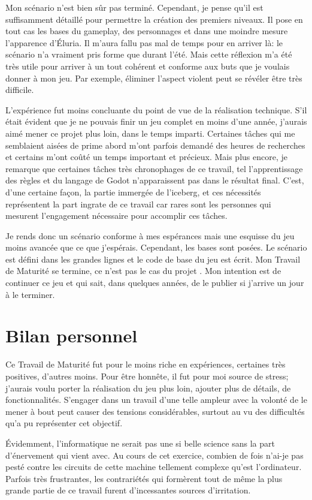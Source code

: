 Mon scénario n'est bien sûr pas terminé. Cependant, je pense qu'il est suffisamment détaillé pour permettre la création des premiers niveaux. Il pose en tout cas les bases du gameplay, des personnages et dans une moindre mesure l'apparence d'Éluria. Il m'aura fallu pas mal de temps pour en arriver là: le scénario n'a vraiment pris forme que durant l'été. Mais cette réflexion m'a été très utile pour arriver à un tout cohérent et conforme aux buts que je voulais donner à mon jeu. Par exemple, éliminer l'aspect violent peut se révéler être très difficile.

L'expérience fut moins concluante du point de vue de la réalisation technique. S'il était évident que je ne pouvais finir un jeu complet en moins d'une année, j'aurais aimé mener ce projet plus loin, dans le temps imparti. Certaines tâches qui me semblaient aisées de prime abord m'ont parfois demandé des heures de recherches et certains  m'ont coûté un temps important et précieux. Mais plus encore, je remarque que certaines tâches très chronophages de ce travail, tel l'apprentissage des règles et du langage de Godot n'apparaissent pas dans le résultat final. C'est, d'une certaine façon, la partie immergée de l'iceberg, et ces nécessités représentent la part ingrate de ce travail car rares sont les personnes qui mesurent l'engagement nécessaire pour accomplir ces tâches.

Je rends donc un scénario conforme à mes espérances mais une esquisse du jeu moins avancée que ce que j'espérais. Cependant, les bases sont posées. Le scénario est défini dans les grandes lignes et le code de base du jeu est écrit. Mon Travail de Maturité se termine, ce n'est pas le cas du projet \nomJeu. Mon intention est de continuer ce jeu et qui sait, dans quelques années, de le publier si j'arrive un jour à le terminer.


\section{Bilan personnel}
Ce Travail de Maturité fut pour le moins riche en expériences, certaines très positives, d'autres moins. Pour être honnête, il fut pour moi source de stress; j'aurais voulu porter la réalisation du jeu plus loin, ajouter plus de détails, de fonctionnalités. S'engager dans un travail d'une telle ampleur avec la volonté de le mener à bout peut causer des tensions considérables, surtout au vu des difficultés qu'a pu représenter cet objectif.

Évidemment, l'informatique ne serait pas une si belle science sans la part d'énervement qui vient avec. Au cours de cet exercice, combien de fois n'ai-je pas pesté contre les circuits de cette machine tellement complexe qu'est l'ordinateur. Parfois très frustrantes, les contrariétés qui formèrent tout de même la plus grande partie de ce travail furent d'incessantes sources d'irritation.

